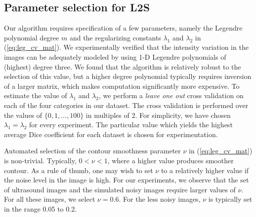 \subsection{Parameter selection for L2S}
Our algorithm requires specification of a few parameters, namely the Legendre polynomial degree $m$ and the regularizing constants $\lambda_1$ and $\lambda_2$ in (\ref{eq:leg_cv_mat}). We experimentally verified that the intensity variation in the images can be adequately modeled by using 1-D Legendre polynomials of (highest) degree three. We found that the algorithm is relatively robust to the selection of this value, but a higher degree polynomial typically requires inversion of a larger matrix, which makes computation significantly more expensive. To estimate the value of $\lambda_1$ and $\lambda_2$, we perform a \textit{leave one out} cross validation on each of the four categories in our dataset. The cross validation is performed over the values of $\{0,1,\ldots,100\}$ in multiples of 2. For simplicity, we have chosen $\lambda_1=\lambda_2$ for every experiment. The particular value which yields the highest average Dice coefficient for each dataset is chosen for experimentation. 


Automated selection of the contour smoothness parameter $\nu$ in (\ref{eq:leg_cv_mat}) is non-trivial. Typically, $0<\nu<1$, where a higher value produces smoother contour. As a rule of thumb, one may wish to set $\nu$ to a relatively higher value if the noise level in the image is high. For our experiments, we observe that the set of ultrasound images and the simulated noisy images require larger values of $\nu$. For all these images, we select $\nu=0.6$. For the less noisy images, $\nu$ is typically set in the range 0.05 to 0.2. 
 
